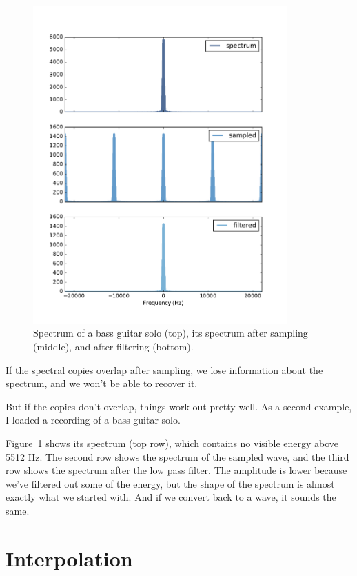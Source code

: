 \documentclass[12pt]{book}
\begin{document}
\begin{figure}
\centerline{\includegraphics[height=4.8in]{figs/sampling5.pdf}}
\caption{Spectrum of a bass guitar solo (top), its spectrum after
sampling (middle), and after filtering (bottom).}
\label{fig.sampling5}
\end{figure}

If the spectral copies overlap after sampling, we lose information
about the spectrum, and we won't be able to recover it.

But if the copies don't overlap, things work out pretty well.  As
a second example, I loaded a recording of a bass guitar solo. 

Figure~\ref{fig.sampling5} shows its spectrum (top row), which contains
no visible energy above 5512 Hz.  The second row shows the spectrum of
the sampled wave, and the third row shows the spectrum after the low
pass filter.  The amplitude is lower because we've filtered out some
of the energy, but the shape of the spectrum is almost exactly what we
started with.  And if we convert back to a wave, it sounds the same.


\section{Interpolation}
\end{document}
